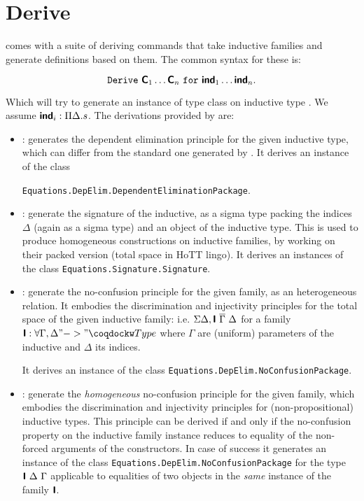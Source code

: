 \section{Derive}

\Equations comes with a suite of deriving commands that take inductive
families and generate definitions based on them. The common syntax for
these is:

\[\mathtt{Derive}~\textbf{\mbox{\textsf{C}}}_1 \ldots \textbf{\mbox{\textsf{C}}}_n~\mathtt{for}~\textbf{\mbox{\textsf{ind}}}_1 \ldots \textbf{\mbox{\textsf{ind}}}_n.\]

Which will try to generate an instance of type class  on
inductive type . We assume $\textbf{\mbox{\textsf{ind}}}_i : \Pi \Delta. s$.
The derivations provided by \Equations are:

\begin{itemize}
\item {}: generates the dependent
  elimination principle for the given inductive type, which can differ
  from the standard one generated by \Coq.
  It derives an instance of the class

  \texttt{Equations.DepElim.DependentEliminationPackage}.
\item {}: generate the signature of the inductive, as a
  sigma type packing the indices $\Delta$ (again as a sigma type) and
  an object of the inductive type. This is used to produce homogeneous
  constructions on inductive families, by working on their packed
  version (total space in HoTT lingo).
  It derives an instances of the class
  \texttt{Equations.Signature.Signature}.

\item {}: generate the no-confusion principle for the
  given family, as an heterogeneous relation. It embodies the
  discrimination and injectivity principles for the
  total space of the given inductive family: i.e.
  $\Sigma \Delta, \textbf{\mbox{\textsf{I}}}~{\overline \Gamma}~\Delta$ for a family
  $\ind{I} : \forall \Gamma, \Delta "->" \kw{Type}$ where $\Gamma$ are
  (uniform) parameters of the inductive and $\Delta$ its indices.

  It derives an instance of the class \texttt{Equations.DepElim.NoConfusionPackage}.

\item {}: generate the \emph{homogeneous} no-confusion
  principle for the given family, which embodies the discrimination and
  injectivity principles for (non-propositional) inductive types.
  This principle can be derived if and only if the no-confusion property
  on the inductive family instance reduces to equality of the non-forced
  arguments of the constructors. In case of success it generates an instance of the class
  \texttt{Equations.DepElim.NoConfusionPackage} for the type $\textbf{\mbox{\textsf{I}}}~
  \Delta~\Gamma$ applicable to equalities of two objects in the \emph{same}
  instance of the family $\textbf{\mbox{\textsf{I}}}$.


\end{itemize}
